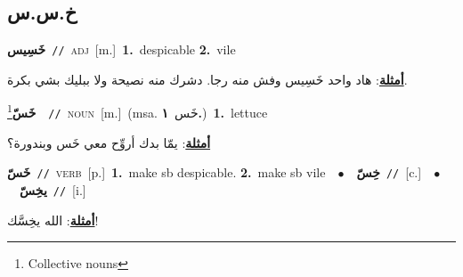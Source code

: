 \documentclass[10pt,a4paper,twoside]{article} %
\begin{document}
\begin{multicols}{2}
\vspace{-3mm}
\subsection*{\color{blue}\foreignlanguage{arabic}{خ.س.س}\color{blue}{}} 

{\setlength\topsep{0pt}\textbf{\foreignlanguage{arabic}{خَسِيس}}\ {\color{gray}\texttt{//}\color{black}}\ \textsc{adj}\ [m.]\ \textbf{1.}~despicable  \textbf{2.}~vile\  \begin{flushright}\color{gray}\foreignlanguage{arabic}{\textbf{\underline{\foreignlanguage{arabic}{أمثلة}}}: هاد واحد خَسِيس وفش منه رجا. دشرك منه نصيحة ولا ببليك بشي بكرة.}\end{flushright}\color{black}} \vspace{2mm}

{\setlength\topsep{0pt}\textbf{\foreignlanguage{arabic}{خَسّ}}\footnote{Collective nouns}\ \ {\color{gray}\texttt{//}\color{black}}\ \textsc{noun}\ [m.]\ \color{gray}(msa. \foreignlanguage{arabic}{خَس}~\foreignlanguage{arabic}{\textbf{١.}})\color{black}\ \textbf{1.}~lettuce\  \begin{flushright}\color{gray}\foreignlanguage{arabic}{\textbf{\underline{\foreignlanguage{arabic}{أمثلة}}}: يمّا بدك أروِّح معي خَس وبندورة؟}\end{flushright}\color{black}} \vspace{2mm}

{\setlength\topsep{0pt}\textbf{\foreignlanguage{arabic}{خَسّ}}\ {\color{gray}\texttt{//}\color{black}}\ \textsc{verb}\ [p.]\ \textbf{1.}~make sb despicable.  \textbf{2.}~make sb vile\ \ $\bullet$\ \ \setlength\topsep{0pt}\textbf{\foreignlanguage{arabic}{خِسّ}}\ {\color{gray}\texttt{//}\color{black}}\ [c.]\ \ $\bullet$\ \ \setlength\topsep{0pt}\textbf{\foreignlanguage{arabic}{يخِسّ}}\ {\color{gray}\texttt{//}\color{black}}\ [i.]\  \begin{flushright}\color{gray}\foreignlanguage{arabic}{\textbf{\underline{\foreignlanguage{arabic}{أمثلة}}}: الله يخِسَّك!}\end{flushright}\color{black}} \vspace{2mm}


\end{multicols}
\end{document}
